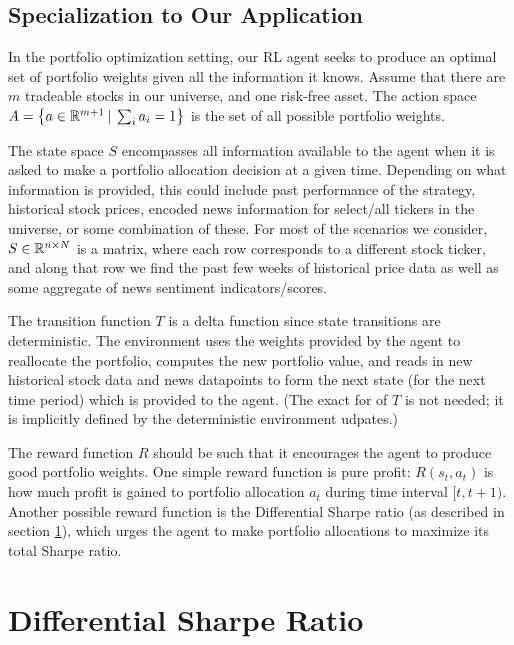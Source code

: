 \subsection{Specialization to Our Application}

In the portfolio optimization setting, our RL agent seeks to produce an optimal set of portfolio weights given all the information it knows.
Assume that there are $m$ tradeable stocks in our universe, and one risk-free asset.
The action space $A = \left\{a \in \mathbb{R}^{m+1} \:|\: \sum_i a_i = 1\right\}$ is the set of all possible portfolio weights.

The state space $S$ encompasses all information available to the agent when it is asked to make a portfolio allocation decision at a given time.
Depending on what information is provided, this could include past performance of the strategy, historical stock prices, encoded news information for
select/all tickers in the universe, or some combination of these. For most of the scenarios we consider, $S \in \mathbb{R}^{n \times N}$ is a matrix, where
each row corresponds to a different stock ticker, and along that row we find the past few weeks of historical price data as well as some
aggregate of news sentiment indicators/scores.

The transition function $T$ is a delta function since state transitions are deterministic.
The environment uses the weights provided by the agent to reallocate the portfolio, computes the new portfolio value,
and reads in new historical stock data and news datapoints to form the next state (for the next time period) which is provided to the agent.
(The exact for of $T$ is not needed; it is implicitly defined by the deterministic environment udpates.)

The reward function $R$ should be such that it encourages the agent to produce good portfolio weights.
One simple reward function is pure profit: $R(s_t, a_t)$ is how much profit is gained to portfolio allocation $a_t$ during time interval $[t, t+1)$.
Another possible reward function is the Differential Sharpe ratio (as described in section \ref{diff_sharpe_ratio_section}), which urges the agent to make portfolio allocations to maximize its total Sharpe ratio. 



\section{Differential Sharpe Ratio}
\label{diff_sharpe_ratio_section}

